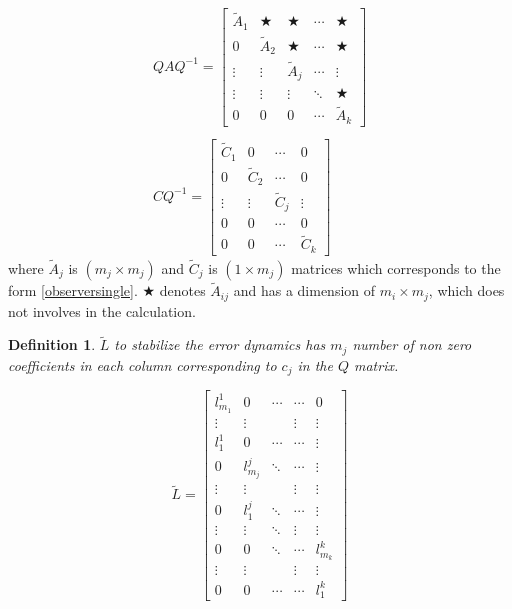 \documentclass{elsarticle}
\newtheorem{Definition}{Definition}
\numberwithin{equation}{section}
\begin{document}
\begin{equation}\label{eq:o6}
	\begin{split}
	{
	QAQ^{-1} = \begin{bmatrix} \widetilde{A}_1 & \bigstar & \bigstar &\cdots & \bigstar\\ 
	0 & \widetilde{A}_2 & \bigstar & \cdots &  \bigstar \\
	\vdots & \vdots & \widetilde{A}_j & \cdots & \vdots \\
	\vdots & \vdots & \vdots & \ddots & \bigstar \\
	0 & 0 & 0 & \cdots &  \widetilde{A}_{k}
	\end{bmatrix}
	}
	\hspace{0cm} \\ \\
	{
	CQ^{-1} = \begin{bmatrix}
   	\widetilde{C}_1 & 0 &\cdots & 0\\
	0 & \widetilde{C}_2 & \cdots & 0\\
	\vdots &\vdots & \widetilde{C}_j & \vdots\\
	0 & 0 &\cdots & 0\\
	0 & 0 &\cdots & \widetilde{C}_k
	\end{bmatrix}
	}	
	\end{split}
\end{equation}
where $\widetilde{A}_j$ is $(m_j \times m_j)$ and $\widetilde{C}_j$ is $(1 \times m_j)$  matrices which corresponds to the form \eqref{observersingle}. $\bigstar$ denotes $\widetilde{A}_{ij}$ and has a dimension of $m_i \times m_j$, which does not involves in the calculation. \\

\begin{Definition}

$\widetilde{L}$ to stabilize the error dynamics has $m_j$ number of non zero coefficients in each column corresponding to $c_j$ in the $Q$ matrix. 

\begin{equation}\label{observergain}
	\widetilde{L} = \begin{bmatrix} 
	l^1_{m_1} & 0 & \cdots & \cdots & 0 \\
	\vdots & \vdots & & \vdots & \vdots \\
	l_{1}^1 & 0 & \cdots & \cdots & \vdots\\
	0 & l_{m_j}^j & \ddots & \cdots & \vdots \\
	\vdots & \vdots &  & \vdots & \vdots \\
	0 & l_{1}^j & \ddots & \cdots & \vdots\\
	\vdots & \vdots & \ddots & \vdots & \vdots \\
	0 & 0 & \ddots & \cdots & l_{m_k}^k \\
	\vdots & \vdots & & \vdots & \vdots \\
	0 & 0 & \cdots & \cdots & l_1^k
	\end{bmatrix}	
\end{equation}

\end{Definition}
\end{document}

